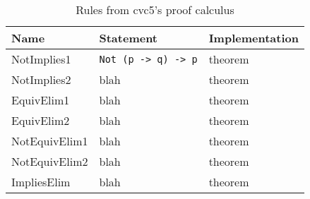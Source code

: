 \begin{table}[]\label{tab:rules}
\centering
\begin{tabular}{ l l l }
\toprule
Name        & Statement & Implementation \\ \midrule
NotImplies1 & \texttt{Not (p -> q) -> p}      & theorem        \\ \midrule
NotImplies2 & blah      & theorem        \\ \midrule
EquivElim1  & blah      & theorem        \\ \midrule
EquivElim2  & blah      & theorem        \\ \midrule
NotEquivElim1  & blah      & theorem        \\ \midrule
NotEquivElim2  & blah      & theorem        \\ \midrule
ImpliesElim & blah      & theorem        \\ \bottomrule
\end{tabular}
\caption{Rules from cvc5's proof calculus}
\end{table}






